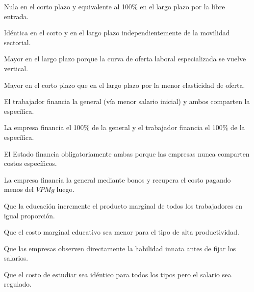 \begin{opts}
    \item Nula en el corto plazo y equivalente al 100\% en el largo plazo por la libre entrada.
    \item Idéntica en el corto y en el largo plazo independientemente de la movilidad sectorial.
    \item Mayor en el largo plazo porque la curva de oferta laboral especializada se vuelve vertical.
    \item Mayor en el corto plazo que en el largo plazo por la menor elasticidad de oferta.
\end{opts}

\begin{opts}
    \item El trabajador financia la general (vía menor salario inicial) y ambos comparten la específica.
    \item La empresa financia el 100\% de la general y el trabajador financia el 100\% de la específica.
    \item El Estado financia obligatoriamente ambas porque las empresas nunca comparten costos específicos.
    \item La empresa financia la general mediante bonos y recupera el costo pagando menos del $VPMg$ luego.
\end{opts}

\begin{opts}
    \item Que la educación incremente el producto marginal de todos los trabajadores en igual proporción.
    \item Que el costo marginal educativo sea menor para el tipo de alta productividad.
    \item Que las empresas observen directamente la habilidad innata antes de fijar los salarios.
    \item Que el costo de estudiar sea idéntico para todos los tipos pero el salario sea regulado.
\end{opts}

